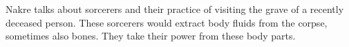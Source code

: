 Nakre talks about sorcerers and their practice of visiting the grave of a recently deceased person. These sorcerers would extract body fluids from the corpse, sometimes also bones. They take their power from these body parts.
